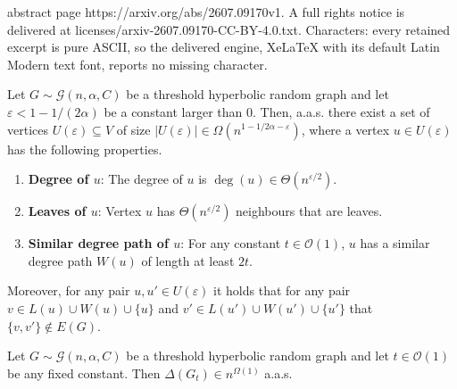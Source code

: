 \documentclass[10pt,a4paper]{amsart}
\newcommand{\aas}{a.a.s.\xspace}
\newcommand{\bigO}{\mathcal{O}}
\newcommand{\eps}{\varepsilon}
\newcommand{\hrg}{\mathcal{G}(n, \alpha, C)}
\begin{document}
abstract page https://arxiv.org/abs/2607.09170v1. A full rights notice is delivered at licenses/arxiv-2607.09170-CC-BY-4.0.txt. Characters: every retained excerpt is pure ASCII, so the delivered engine, XeLaTeX with its default Latin Modern text font, reports no missing character.
\begin{lemma}\label{lem:luby-obstruction}
    Let $G \sim \hrg$ be a threshold hyperbolic random graph and let $\eps < 1 - 1/(2\alpha)$ be a constant larger than $0$. Then, \aas there exist a set of vertices $U(\eps) \subseteq V$ of size $|U(\eps)| \in \Omega\left(n^{1 - 1/2\alpha -\eps}\right)$, where a vertex $u \in U(\eps)$ has the following properties.
%
    \begin{enumerate}
           \item\label{item:property1}\textbf{Degree of $u$}: The degree of $u$ is $\deg(u) \in \Theta(n^{\eps / 2})$.
        \item\label{item:property2}\textbf{Leaves of $u$}: Vertex $u$ has $\Theta(n^{\eps / 2})$ neighbours that are leaves.
        \item\label{item:property3}\textbf{Similar degree path of $u$}: For any constant $t \in \bigO(1)$, $u$ has a similar degree path $W(u)$ of length at least $2t$.
    \end{enumerate}
     Moreover, for any pair $u, u' \in U(\eps)$ it holds that for any pair $v \in L(u) \cup W(u) \cup \{u\}$ and $v' \in L(u') \cup W(u') \cup \{u'\}$ that $\{v,v'\} \not\in E(G)$.
%
\end{lemma}

\begin{proposition}\label{luby-aint-shatter-my-hrg}  Let $G \sim \hrg$ be a threshold hyperbolic random graph and let $t \in \bigO(1)$ be any fixed constant. Then $\Delta(G_t) \in n^{\Omega(1)}$ \aas   
\end{proposition}
\end{document}
